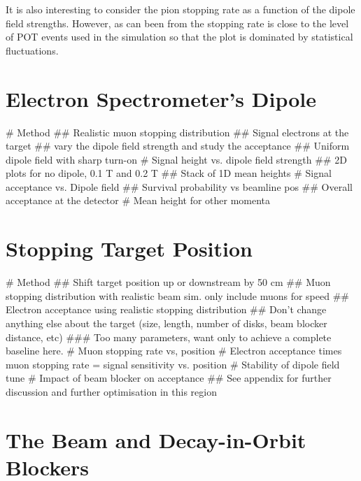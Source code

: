 It is also interesting to consider the pion stopping rate as a function of the dipole field strengths.
However, as can been from  the stopping rate is close to the level of POT events used in the simulation so that the plot is dominated by statistical fluctuations.

\section{Electron Spectrometer's Dipole}
\begin{easylist}
# Method
	## Realistic muon stopping distribution
	## Signal electrons at the target 
	## vary the dipole field strength and study the acceptance
	## Uniform dipole field with sharp turn-on
# Signal height vs. dipole field strength
	## 2D plots for no dipole, 0.1 T and 0.2 T
	## Stack of 1D mean heights
# Signal acceptance vs. Dipole field
	## Survival probability vs beamline pos
	## Overall acceptance at the detector
# Mean height for other momenta
\end{easylist}
\FigOptimESTDipoleBeamHeightTwoD
\FigOptimESTDipoleBeamHeightMean
\FigOptimESTDipoleBeamFluxMean
\FigOptimESTDipoleAcceptanceVsDipole

\section{Stopping Target Position}
\begin{easylist}
# Method
	## Shift target position up or downstream by 50 cm 
	## Muon stopping distribution with realistic beam sim. only include muons for speed
	## Electron acceptance using realistic stopping distribution
	## Don't change anything else about the target (size, length, number of disks, beam blocker distance, etc)
	### Too many parameters, want only to achieve a complete baseline here.
# Muon stopping rate vs, position
# Electron acceptance times muon stopping rate = signal sensitivity vs. position
# Stability of dipole field tune
# Impact of beam blocker on acceptance
## See appendix for further discussion and further optimisation in this region
\end{easylist}
\FigOptimStopTgtPosMuStops
\FigOptimStopTgtPosSensitivitySpect
\FigOptimStopTgtPosSensitivityIntegral
\FigOptimStopTgtPosSensitivityNoBeamBlock

\section{The Beam and Decay-in-Orbit Blockers}

